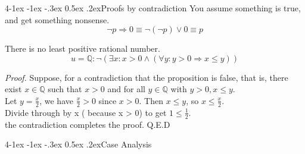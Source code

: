 \documentclass{tufte-handout}
\makeatletter
\renewcommand{\paragraph}{\@startsection{paragraph}%
    {4}{\z@}{-1ex \@plus -1ex \@minus -.3ex}%
    {0.5ex \@plus .2ex}{\normalfont\normalsize\bfseries}}
\makeatother
\begin{document}
\paragraph{Proofs by contradiction}
You assume something is true, and get something nonsense.\\
\[\neg p \Rightarrow 0 \equiv \neg (\neg p) \vee 0 \equiv p\]

\begin{Proposition}
    There is no least positive rational number.\\
    \[u = \mathbb{Q }: \neg (\exists x : x>0 \wedge (\forall y: y > 0 \Rightarrow x \leq y))\]
\end{Proposition}

\textit{Proof.} Suppose, for a contradiction that the proposition is false, that is,
there exist $  x \in \mathbb{ Q } $ such that $ x>0 $ and for all $ y \in \mathbb{Q } $ with $ y>0, x \leq y  $.\\
Let $ y = \frac{x }{2}$, we have $ \frac{x }{2} > 0 $ since $ x>0 $. Then $ x \leq y  $, so $ x \leq \frac{x }{2} $.\\
Divide through by x ( because x > 0) to get $ 1 \leq \frac{1}{2}$.\\
the contradiction completes the proof. Q.E.D



\paragraph{Case Analysis}
\end{document}
